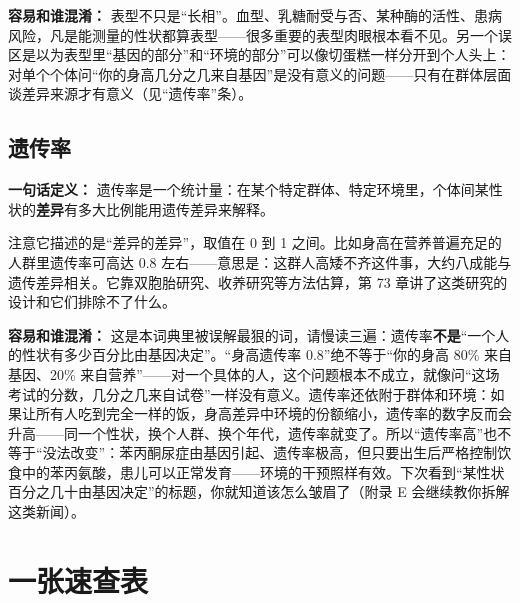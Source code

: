 \textbf{容易和谁混淆：} 表型不只是“长相”。血型、乳糖耐受与否、某种酶的活性、患病风险，凡是能测量的性状都算表型——很多重要的表型肉眼根本看不见。另一个误区是以为表型里“基因的部分”和“环境的部分”可以像切蛋糕一样分开到个人头上：对单个个体问“你的身高几分之几来自基因”是没有意义的问题——只有在群体层面谈差异来源才有意义（见“遗传率”条）。

\subsection{遗传率}

\textbf{一句话定义：} 遗传率是一个统计量：在某个特定群体、特定环境里，个体间某性状的\textbf{差异}有多大比例能用遗传差异来解释。

注意它描述的是“差异的差异”，取值在 0 到 1 之间。比如身高在营养普遍充足的人群里遗传率可高达 0.8 左右——意思是：这群人高矮不齐这件事，大约八成能与遗传差异相关。它靠双胞胎研究、收养研究等方法估算，第 73 章讲了这类研究的设计和它们排除不了什么。

\textbf{容易和谁混淆：} 这是本词典里被误解最狠的词，请慢读三遍：遗传率\textbf{不是}“一个人的性状有多少百分比由基因决定”。“身高遗传率 0.8”绝不等于“你的身高 80\% 来自基因、20\% 来自营养”——对一个具体的人，这个问题根本不成立，就像问“这场考试的分数，几分之几来自试卷”一样没有意义。遗传率还依附于群体和环境：如果让所有人吃到完全一样的饭，身高差异中环境的份额缩小，遗传率的数字反而会升高——同一个性状，换个人群、换个年代，遗传率就变了。所以“遗传率高”也不等于“没法改变”：苯丙酮尿症由基因引起、遗传率极高，但只要出生后严格控制饮食中的苯丙氨酸，患儿可以正常发育——环境的干预照样有效。下次看到“某性状百分之几十由基因决定”的标题，你就知道该怎么皱眉了（附录 E 会继续教你拆解这类新闻）。

\section*{一张速查表}

